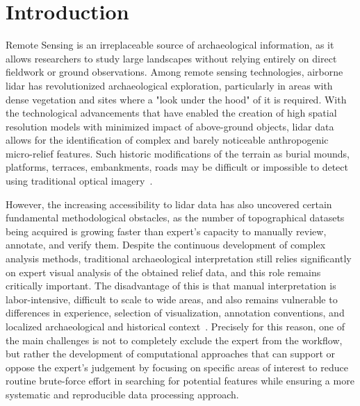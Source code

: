
\chapter{Introduction}\label{ch:introduction}

Remote Sensing is an irreplaceable source of archaeological information, as it allows researchers to study large landscapes without relying entirely on direct fieldwork or ground observations. Among remote sensing technologies, airborne \gls{lidar} has revolutionized archaeological exploration, particularly in areas with dense vegetation and sites where a "look under the hood" of it is required. With the technological advancements that have enabled the creation of high spatial resolution models with minimized impact of above-ground objects, \gls{lidar} data allows for the identification of complex and barely noticeable anthropogenic micro-relief features. Such historic modifications of the terrain as burial mounds, platforms, terraces, embankments, roads may be difficult or impossible to detect using traditional optical imagery~\cite{thompson_detecting_2020,kokalj_standardizing_2025}.

However, the increasing accessibility to \gls{lidar} data has also uncovered certain fundamental methodological obstacles, as the number of topographical datasets being acquired is growing faster than expert's capacity to manually review, annotate, and verify them. Despite the continuous development of complex analysis methods, traditional archaeological interpretation still relies significantly on expert visual analysis of the obtained relief data, and this role remains critically important. The disadvantage of this is that manual interpretation is labor-intensive, difficult to scale to wide areas, and also remains vulnerable to differences in experience, selection of visualization, annotation conventions, and localized archaeological and historical context~\cite {trier_using_2019,verschoof-van_der_vaart_combining_2020,kokalj_standardizing_2025}. Precisely for this reason, one of the main challenges is not to completely exclude the expert from the workflow, but rather the development of computational approaches that can support or oppose the expert's judgement by focusing on specific areas of interest to reduce routine brute-force effort in searching for potential features while ensuring a more systematic and reproducible data processing approach.

